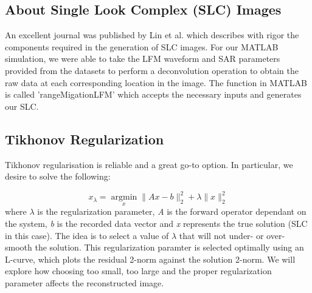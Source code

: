 \documentclass[conference]{IEEEtran}
\begin{document}
\subsection{About Single Look Complex (SLC) Images}
\par An excellent journal was published by Lin et al.\cite{linEtAl} which describes with rigor the components required in the generation of SLC images. For our MATLAB simulation, we were able to take the LFM waveform and SAR parameters provided from the datasets to perform a deconvolution operation to obtain the raw data at each corresponding location in the image. The function in MATLAB is called 'rangeMigationLFM' which accepts the necessary inputs and generates our SLC.
\subsection{Tikhonov Regularization}
\par Tikhonov regularisation is reliable and a great go-to option. In particular, we desire to solve the following:

\begin{equation}
    x_\lambda = \operatorname*{argmin}_{x} {\|Ax-b\|^2_2+\lambda\|x\|^2_2}
\end{equation}
where \emph{$\lambda$} is the regularization parameter, \emph{A} is the forward operator dependant on the system, \emph{b} is the recorded data vector and \emph{x} represents the true solution (SLC in this case). The idea is to select a value of \emph{$\lambda$} that will not under- or over-smooth the solution\cite{hansen}. This regularization paramter is selected optimally using an L-curve, which plots the residual 2-norm against the solution 2-norm. We will explore how choosing too small, too large and the proper regularization parameter affects the reconstructed image.
\end{document}
